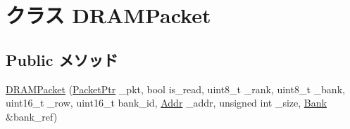\hypertarget{classDRAMCtrl_1_1DRAMPacket}{
\section{クラス DRAMPacket}
\label{classDRAMCtrl_1_1DRAMPacket}
}
\subsection*{Public メソッド}
\begin{DoxyCompactItemize}
\item 
\hyperlink{classDRAMCtrl_1_1DRAMPacket_a80655cee61e7cbc2d5dff02d112876e2}{DRAMPacket} (\hyperlink{classPacket}{PacketPtr} \_\-pkt, bool is\_\-read, uint8\_\-t \_\-rank, uint8\_\-t \_\-bank, uint16\_\-t \_\-row, uint16\_\-t bank\_\-id, \hyperlink{base_2types_8hh_af1bb03d6a4ee096394a6749f0a169232}{Addr} \_\-addr, unsigned int \_\-size, \hyperlink{classDRAMCtrl_1_1Bank}{Bank} \&bank\_\-ref)
\end{DoxyCompactItemize}
